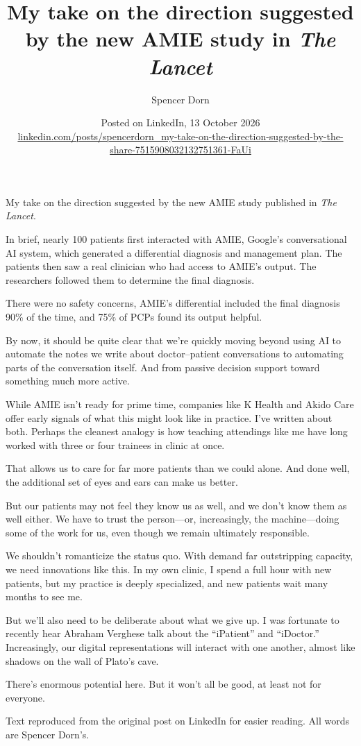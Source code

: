 \documentclass[11pt]{article}
\title{\textbf{My take on the direction suggested by the new AMIE study in \textit{The Lancet}}}
\author{Spencer Dorn}
\date{Posted on LinkedIn, 13 October 2026\\[0.3em]
\small\href{https://www.linkedin.com/posts/spencerdorn_my-take-on-the-direction-suggested-by-the-share-7515908032132751361-FaUi/}{linkedin.com/posts/spencerdorn\_my-take-on-the-direction-suggested-by-the-share-7515908032132751361-FaUi}}
\begin{document}
\maketitle

My take on the direction suggested by the new AMIE study published in \textit{The Lancet}.

In brief, nearly 100 patients first interacted with AMIE, Google's conversational AI system, which generated a differential diagnosis and management plan. The patients then saw a real clinician who had access to AMIE's output. The researchers followed them to determine the final diagnosis.

There were no safety concerns, AMIE's differential included the final diagnosis 90\% of the time, and 75\% of PCPs found its output helpful.

By now, it should be quite clear that we're quickly moving beyond using AI to automate the notes we write about doctor--patient conversations to automating parts of the conversation itself. And from passive decision support toward something much more active.

While AMIE isn't ready for prime time, companies like K Health and Akido Care offer early signals of what this might look like in practice. I've written about both. Perhaps the cleanest analogy is how teaching attendings like me have long worked with three or four trainees in clinic at once.

That allows us to care for far more patients than we could alone. And done well, the additional set of eyes and ears can make us better.

But our patients may not feel they know us as well, and we don't know them as well either. We have to trust the person---or, increasingly, the machine---doing some of the work for us, even though we remain ultimately responsible.

We shouldn't romanticize the status quo. With demand far outstripping capacity, we need innovations like this. In my own clinic, I spend a full hour with new patients, but my practice is deeply specialized, and new patients wait many months to see me.

But we'll also need to be deliberate about what we give up. I was fortunate to recently hear Abraham Verghese talk about the ``iPatient'' and ``iDoctor.'' Increasingly, our digital representations will interact with one another, almost like shadows on the wall of Plato's cave.

There's enormous potential here. But it won't all be good, at least not for everyone.

\vfill
\begin{center}\footnotesize
Text reproduced from the original post on LinkedIn for easier reading. All words are Spencer Dorn's.
\end{center}
\end{document}

